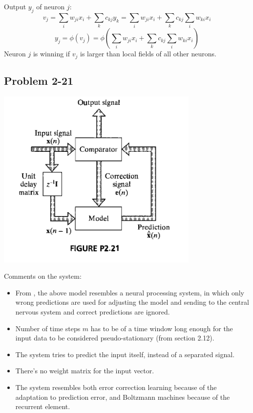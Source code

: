 \documentclass[paper=a4, fontsize=11pt]{scrartcl} %
\begin{document}
    Output $y_j$ of neuron $j$:
    \[ v_j = \sum_i w_{ji} x_i + \sum_k c_{kj} y_k = \sum_i w_{ji} x_i + \sum_k c_{kj} \sum_i w_{ki} x_i \]
    \[ y_j = \phi(v_j) = \phi \left( \sum_i w_{ji} x_i + \sum_k c_{kj} \sum_i w_{ki} x_i \right) \]
    Neuron $j$ is winning if $v_j$ is larger than local fields of all other neurons.

    \subsection*{Problem 2-21}

    \begin{center}
        \setlength{\fboxsep}{0.5pt} %
        \setlength{\fboxrule}{0.5pt} %
        \includegraphics[width=10.0cm]{../images/Haykin-NN-figurep2-21.png} %
    \end{center}

    Comments on the system:
    \begin{itemize}
        \item From \cite{mead1990}, the above model resembles a neural processing system, in which only wrong predictions are used for adjusting the model and sending to the central nervous system and correct predictions are ignored.
        \item Number of time steps $m$ has to be of a time window long enough for the input data to be considered pseudo-stationary (from section 2.12).
        \item The system tries to predict the input itself, instead of a separated signal.
        \item There's no weight matrix for the input vector.
        \item The system resembles both error correction learning because of the adaptation to prediction error, and Boltzmann machines because of the recurrent element.
    \end{itemize}

    \printbibliography
\end{document}
